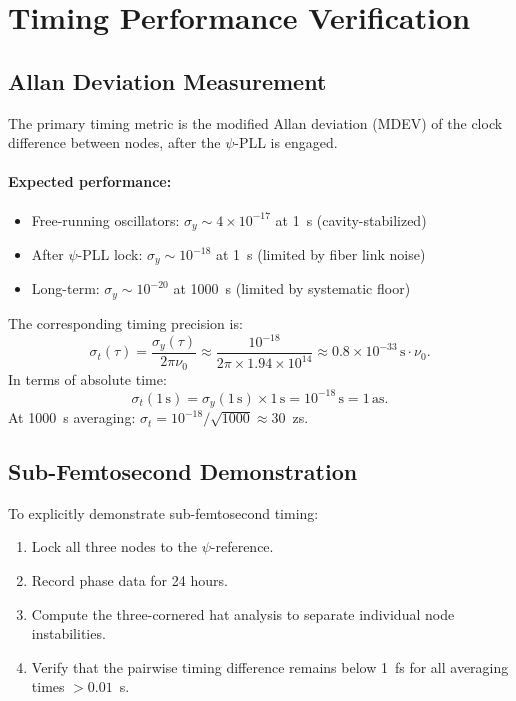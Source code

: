 \documentclass[12pt,letterpaper]{article}
\begin{document}
\section{Timing Performance Verification}

\subsection{Allan Deviation Measurement}

The primary timing metric is the modified Allan deviation (MDEV) of the
clock difference between nodes, after the $\psi$-PLL is engaged.

\paragraph{Expected performance:}
\begin{itemize}
\item Free-running oscillators: $\sigma_y \sim 4\times10^{-17}$ at 1~s
(cavity-stabilized)
\item After $\psi$-PLL lock: $\sigma_y \sim 10^{-18}$ at 1~s
(limited by fiber link noise)
\item Long-term: $\sigma_y \sim 10^{-20}$ at 1000~s
(limited by systematic floor)
\end{itemize}

The corresponding timing precision is:
\begin{equation}
\sigma_t(\tau) = \frac{\sigma_y(\tau)}{2\pi\nu_0}
\approx \frac{10^{-18}}{2\pi\times 1.94\times10^{14}}
\approx 0.8\times10^{-33}\,\text{s} \cdot \nu_0.
\end{equation}
In terms of absolute time:
\begin{equation}
\sigma_t(1\,\text{s}) = \sigma_y(1\,\text{s}) \times 1\,\text{s}
= 10^{-18}\,\text{s} = 1\,\text{as}.
\end{equation}
At 1000~s averaging: $\sigma_t = 10^{-18}/\sqrt{1000} \approx 30$~zs.

\subsection{Sub-Femtosecond Demonstration}

To explicitly demonstrate sub-femtosecond timing:
\begin{enumerate}
\item Lock all three nodes to the $\psi$-reference.
\item Record phase data for 24 hours.
\item Compute the three-cornered hat analysis to separate individual
node instabilities.
\item Verify that the pairwise timing difference remains below 1~fs
for all averaging times $> 0.01$~s.
\end{enumerate}
\end{document}
